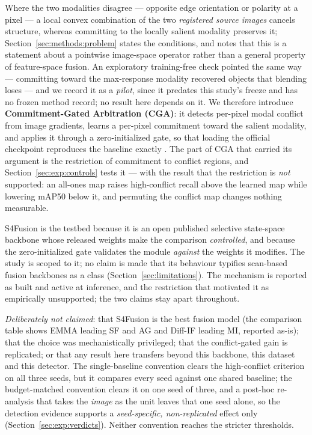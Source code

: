 \documentclass[pdflatex,sn-mathphys-num]{sn-jnl}
\theoremstyle{thmstyleone}%
\theoremstyle{thmstyletwo}%
\theoremstyle{thmstylethree}%
\begin{document}
Where the two modalities disagree --- opposite edge orientation or polarity at a pixel --- a local convex combination of the two \emph{registered source images} cancels structure, whereas committing to the locally salient modality preserves it; Section~\ref{sec:methods:problem} states the conditions, and notes that this is a statement about a pointwise image-space operator rather than a general property of feature-space fusion. An exploratory training-free check pointed the same way --- committing toward the max-response modality recovered objects that blending loses --- and we record it as a \emph{pilot}, since it predates this study's freeze and has no frozen method record; no result here depends on it. We therefore introduce \textbf{Commitment-Gated Arbitration (CGA)}: it detects per-pixel modal conflict from image gradients, learns a per-pixel commitment toward the salient modality, and applies it through a zero-initialized gate, so that loading the official checkpoint reproduces the baseline exactly \cite{bachlechner2021rezero}. The part of CGA that carried its argument is the restriction of commitment to conflict regions, and Section~\ref{sec:exp:controls} tests it --- with the result that the restriction is \emph{not} supported: an all-ones map raises high-conflict recall above the learned map while lowering mAP50 below it, and permuting the conflict map changes nothing measurable.

S4Fusion is the testbed because it is an open published selective state-space backbone whose released weights make the comparison \emph{controlled}, and because the zero-initialized gate validates the module \emph{against} the weights it modifies. The study is scoped to it; no claim is made that its behaviour typifies scan-based fusion backbones as a class (Section~\ref{sec:limitations}). The mechanism is reported as built and active at inference, and the restriction that motivated it as empirically unsupported; the two claims stay apart throughout.

\emph{Deliberately not claimed}: that S4Fusion is the best fusion model (the comparison table shows EMMA \cite{zhao2024equivariant} leading SF and AG and Diff-IF \cite{yi2024diffif} leading MI, reported as-is); that the choice was mechanistically privileged; that the conflict-gated gain is replicated; or that any result here transfers beyond this backbone, this dataset and this detector. The single-baseline convention clears the high-conflict criterion on all three seeds, but it compares every seed against one shared baseline; the budget-matched convention clears it on one seed of three, and a post-hoc re-analysis that takes the \emph{image} as the unit leaves that one seed alone, so the detection evidence supports a \emph{seed-specific, non-replicated} effect only (Section~\ref{sec:exp:verdicts}). Neither convention reaches the stricter thresholds.
\end{document}

